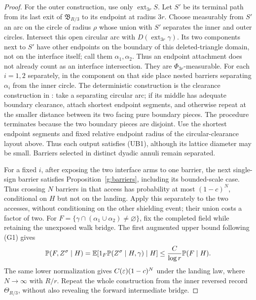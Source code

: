 \begin{proof}
For the outer construction, use only \(\operatorname{ext}_{3r}S\).
Let \(S'\) be its terminal path from its last exit of
\(\mathfrak B_{R/3}\) to its endpoint at radius \(3r\).
Choose measurably from \(S'\) an arc on the circle of radius \(\rho\)
whose union with \(S'\) separates the inner and outer circles.
Intersect this open circular arc with \(D(\operatorname{ext}_{3r}\gamma)\).
Its two components next to \(S'\) have other endpoints on the boundary
of this deleted-triangle domain, not on the interface itself;
call them \(\alpha_1,\alpha_2\). Thus an endpoint attachment does
not already count as an interface intersection. They are
\(\Phi_{3r}\)-measurable. For each \(i=1,2\) separately, in the
component on that side place nested barriers separating \(\alpha_i\)
from the inner circle.
The deterministic construction is the clearance construction in
\cite[proof of (3.48)]{SSdiscrete}: take a separating circular arc;
if its middle has adequate boundary clearance, attach shortest
endpoint segments, and otherwise repeat at the smaller distance
between its two facing pure boundary pieces. The procedure
terminates because the two boundary pieces are disjoint.
Use the shortest endpoint segments and fixed relative endpoint
radius of the circular-clearance layout above. Thus each output
satisfies (UB1), although its lattice diameter may be small.
Barriers selected in distinct dyadic annuli remain separated.

For a fixed \(i\), after exposing the two interface arms to one
barrier, the next single-sign barrier satisfies
Proposition~\ref{g:barriers}, including its bounded-scale case.
Thus crossing \(N\) barriers in that access has probability at most
\((1-c)^N\), conditional on \(H\) but not on the landing.
Apply this separately to the two accesses, without conditioning on
the other shielding event; their union costs a factor of two.
For \(F=\{\gamma\cap(\alpha_1\cup\alpha_2)\ne\varnothing\}\),
fix the completed field while retaining the unexposed walk bridge.
The first augmented upper bound following (G1) gives
\[
 \mathbb P(F,Z^\sigma\mid H)
 =\mathbb E[1_F\mathbb P(Z^\sigma\mid H,\gamma)\mid H]
 \leq \frac{C}{\log r}\mathbb P(F\mid H).
\]
The same lower normalization gives \(C(\varepsilon)(1-c)^N\) under the
landing law, where \(N\to\infty\) with \(R/r\). Repeat the whole
construction from the inner reversed record \(\Theta_{R/3}\),
without also revealing the forward intermediate bridge.


\end{proof}
